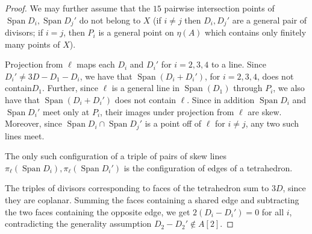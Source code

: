 \documentclass[11pt]{amsart}
\newcommand{\Span}{\operatorname{Span}}
\theoremstyle{definition}
\theoremstyle{remark}
\begin{document}
\begin{proof}
We may further assume that the $15$ pairwise intersection points of $\Span D_i, \Span D_j'$ do not belong to $X$ (if \(i \neq j\) then \(D_i, D_j'\) are a general pair of divisors; if \(i=j\), then \(P_i\) is a general point on \(\eta(A)\) which contains only finitely many points of \(X\)).

Projection from \(\ell\) maps each \(D_i\) and \(D_i'\) for \(i=2,3,4\) to a line.
Since \(D_i' \neq 3D - D_1 - D_i\), we have that $\Span(D_i + D_i')$, for $i=2,3,4$, does not contain\(D_1\).  Further, since $\ell$ is a general line in \(\Span(D_1)\) through \(P_i\), we also have that $\Span(D_i + D_i')$ does not contain \(\ell\).
Since in addition \(\Span D_i\) and \(\Span D_i'\) meet only at \(P_i\), their images under projection from \(\ell\) are skew.  Moreover, since \(\Span D_i \cap \Span D_j'\) is a point off of \(\ell\) for \(i \neq j\), any two such lines meet.

The only such configuration of a triple of pairs of skew lines $\pi_\ell(\Span D_i), \pi_\ell(\Span D_i')$ is the configuration of edges of a tetrahedron. 

\begin{center}
\end{center}
The triples of divisors corresponding to faces of the tetrahedron sum to $3D$, since they are coplanar. Summing the faces containing a shared edge and subtracting the two faces containing the opposite edge, we get $2(D_i-D_i')=0$ for all $i$, contradicting the generality assumption $D_2-D_2' \not\in A[2]$. 
\medskip


\end{proof}
\end{document}
